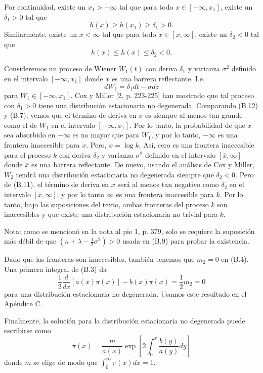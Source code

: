 \documentclass[a4paper,12pt]{article}
\begin{document}
\begin{itemize}
	Por continuidad, existe un $x_1 > -\infty$ tal que para todo $x \in [-\infty, x_1]$, existe un $\delta_1 > 0$ tal que
\[
		h(x) \geq h(x_1) \geq \delta_1 > 0.
\]
	Similarmente, existe un $\overline{x} < \infty$ tal que para todo $x \in [\overline{x}, \infty]$, existe un $\delta_2 < 0$ tal que
\[
		h(x) \leq h(\overline{x}) \leq \delta_2 < 0.
\]
	
	Consideremos un proceso de Wiener $W_1(t)$ con deriva $\delta_1$ y varianza $\sigma^2$ definido en el intervalo $[-\infty, x_1]$ donde $x$ es una barrera reflectante. I.e.
	\[
		dW_1 = \delta_1 dt - \sigma dz
		\tag{B.12}
		\]
	para $W_1 \in [-\infty, x_1]$. Cox y Miller [2, p. 223-225] han mostrado que tal proceso con $\delta_1 > 0$ tiene una distribución estacionaria no degenerada. Comparando (B.12) y (B.7), vemos que el término de deriva en $x$ es siempre al menos tan grande como el de $W_1$ en el intervalo $[-\infty, x_1]$. Por lo tanto, la probabilidad de que $x$ sea absorbido en $-\infty$ es no mayor que para $W_1$, y por lo tanto, $-\infty$ es una frontera inaccesible para $x$. Pero, $x = \log k$. Así, cero es una frontera inaccesible para el proceso $k$ con deriva $\delta_2$ y varianza $\sigma^2$ definido en el intervalo $[\overline{x}, \infty]$ donde $\overline{x}$ es una barrera reflectante. De nuevo, usando el análisis de Cox y Miller, $W_2$ tendrá una distribución estacionaria no degenerada siempre que $\delta_2 < 0$. Pero de (B.11), el término de deriva en $x$ será al menos tan negativo como $\delta_2$ en el intervalo $[\overline{x}, \infty]$, y por lo tanto $\infty$ es una frontera inaccesible para $k$. Por lo tanto, bajo las suposiciones del texto, ambas fronteras del proceso $k$ son inaccesibles y que existe una distribución estacionaria no trivial para $k$.
	
	Nota: como se mencionó en la nota al pie 1, p. 379, solo se requiere la suposición más débil de que $(n + \lambda - \frac{1}{2} \sigma^2) > 0$ usada en (B.9) para probar la existencia.
	
	Dado que las fronteras son inaccesibles, también tenemos que $m_2 = 0$ en (B.4). Una primera integral de (B.3) da
	\[
		\frac{1}{2} \frac{d}{dx} [a(x) \pi(x)] - b(x) \pi(x) = \frac{1}{2} m_2 = 0
		\]
	para una distribución estacionaria no degenerada. Usamos este resultado en el Apéndice C.
	
	Finalmente, la solución para la distribución estacionaria no degenerada puede escribirse como
\[
		\pi(x) = \frac{m}{a(x)} \exp \left[ 2 \int_0^x \frac{b(y)}{a(y)} dy \right]
\] 
	donde $m$ se elige de modo que $\int_0^\infty \pi(x) dx = 1$.
\end{itemize}
\end{document}

